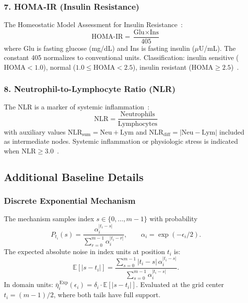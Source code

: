 \subsubsection*{7. HOMA-IR (Insulin Resistance)}
The Homeostatic Model Assessment for Insulin Resistance~\cite{matthews1985homeostasis}:
\begin{equation}
\text{HOMA-IR} = \frac{\text{Glu} \times \text{Ins}}{405}
\end{equation}
where Glu is fasting glucose (mg/dL) and Ins is fasting insulin ($\mu$U/mL). The constant 405 normalizes to conventional units. Classification: insulin sensitive ($\text{HOMA} < 1.0$), normal ($1.0 \leq \text{HOMA} < 2.5$), insulin resistant ($\text{HOMA} \geq 2.5$)~\cite{gayoso2016homa}.

\subsubsection*{8. Neutrophil-to-Lymphocyte Ratio (NLR)}
The NLR is a marker of systemic inflammation~\cite{zahorec2001ratio}:
\begin{equation}
\text{NLR} = \frac{\text{Neutrophils}}{\text{Lymphocytes}}
\end{equation}
with auxiliary values $\text{NLR}_{\text{sum}} = \text{Neu} + \text{Lym}$ and $\text{NLR}_{\text{diff}} = |\text{Neu} - \text{Lym}|$ included as intermediate nodes. Systemic inflammation or physiologic stress is indicated when $\text{NLR} \geq 3.0$~\cite{forget2017normal}.


\subsection{Additional Baseline Details}
\label{app:baselines}
\subsubsection{\textbf{Discrete Exponential Mechanism}}
\label{app:exp-noise}

The mechanism samples index $s \in \{0, \dots, m{-}1\}$ with probability
\[
    P_{t_i}(s) = \frac{\alpha_i^{|t_i - s|}}{\sum_{r=0}^{m-1} \alpha_i^{|t_i - r|}}, \qquad \alpha_i = \exp(-\epsilon_i/2).
\]
The expected absolute noise in index units at position $t_i$ is:
\begin{equation}
\label{eq:bar-eta-discrete}
    \mathbb{E}[|s - t_i|] = \frac{\sum_{s=0}^{m-1} |t_i - s|\,\alpha_i^{|t_i - s|}}{\sum_{s=0}^{m-1} \alpha_i^{|t_i - s|}}.
\end{equation}
In domain units: $\bar{\eta}_i^{\,\mathrm{Exp}}(\epsilon_i) = \delta_i \cdot \mathbb{E}[|s - t_i|]$. Evaluated at the grid center $t_i = (m{-}1)/2$, where both tails have full support.

